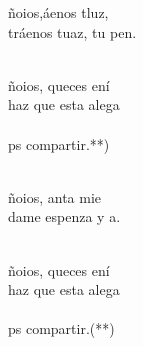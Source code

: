 \begin{cancion}%
	ñoios,áenos tluz,\\
	tráenos tuaz, tu pen. \\\jump\\
	\begin{chorus}%
	ñoios, queces ení\\
	haz que esta alega \\
{}\vspace*{-0.4cm}\\
	ps compartir.\chord{}{)}{(}**)\\
	\end{chorus}%
	\jump\\
	ñoios, anta mie\\
	dame espenza y a.\\\jump\\
	\begin{chorus}%
	ñoios, queces ení\\
	haz que esta alega \\
{}\vspace*{-0.4cm}\\
	ps compartir.\chord{}{)}{ }(**)\\
	\end{chorus}%
	\jump\\
\end{cancion}%

